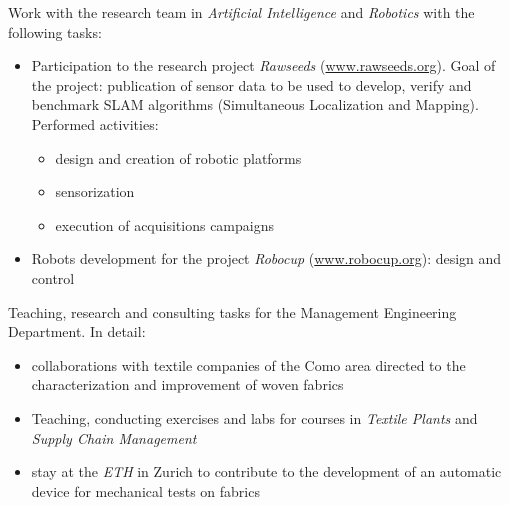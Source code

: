 \documentclass[11pt,a4paper,sans]{moderncv} %
\begin{document}


{Work with the research team in \emph{Artificial Intelligence} and \emph{Robotics} with the following tasks:
\begin{itemize}
	\item Participation to the research project \emph{Rawseeds} (\url{www.rawseeds.org}). Goal of the project:
	 publication of sensor data to be used to develop, verify and benchmark SLAM algorithms	(Simultaneous Localization and Mapping). Performed activities:
	\begin{itemize}
		\item design and creation of robotic platforms
		\item sensorization
		\item execution of acquisitions campaigns
	\end{itemize}
	\item Robots development for the project \emph{Robocup} (\url{www.robocup.org}): design and control
\end{itemize} }



{Teaching, research and consulting tasks for the Management Engineering Department. In detail:
	\begin{itemize}
		\item collaborations with textile companies of the Como area directed to the characterization and improvement of woven fabrics
		\item Teaching, conducting exercises and labs for courses in
		\emph{Textile Plants} and \emph{Supply Chain Management}
		\item stay  at the \emph{ETH} in Zurich to contribute to the development of an automatic device for mechanical tests on fabrics
	\end{itemize}}
\end{document}
